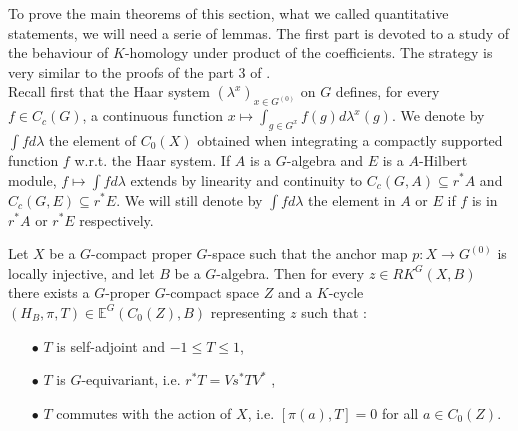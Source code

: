 
To prove the main theorems of this section, what we called quantitative statements, we will need a serie of lemmas. The first part is devoted to a study of the behaviour of $K$-homology under product of the coefficients. The strategy is very similar to the proofs of the part $3$ of \cite{TuBC2}. \\



Recall first that the Haar system $(\lambda^x)_{x\in G^{(0)}}$ on $G$ defines, for every $f\in C_c(G)$, a continuous function $x\mapsto \int_{g\in G^x}f(g)d\lambda^x(g)$. We denote by $\int f d\lambda$ the element of $C_0(X)$ obtained when integrating a compactly supported function $f$ w.r.t. the Haar system. If $A$ is a $G$-algebra and $E$ is a $A$-Hilbert module, $f\mapsto \int f d\lambda$ extends by linearity and continuity to $C_c(G,A)\subseteq r^*A $ and $C_c(G,E)\subseteq r^*E$. We will still denote by $\int fd\lambda$ the element in $A$ or $E$ if $f$ is in $r^* A$ or $r^* E$ respectively. %

\begin{lem}\label{JLTform}
Let $X$ be a $G$-compact proper $G$-space such that the anchor map $p:X\rightarrow G^{(0)}$ is locally injective, and let $B$ be a $G$-algebra. Then for every $z\in RK^G(X,B)$ there exists a $G$-proper $G$-compact space $Z$ and a $K$-cycle $(H_B, \pi, T)\in \mathbb E^G(C_0(Z),B)$ representing $z$ such that :
\begin{itemize}
\item[$\bullet$] $T$ is self-adjoint and $-1 \leq T\leq 1$,
\item[$\bullet$] $T$ is $G$-equivariant, i.e. $r^* T = V s^*T V^*$ ,
\item[$\bullet$] $T$ commutes with the action of $X$, i.e. $[\pi(a),T]= 0$ for all $a\in C_0(Z)$.
\end{itemize}
\end{lem}

